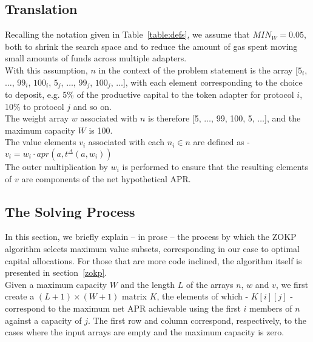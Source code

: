 \documentclass{article}
\begin{document}
\subsection{Translation}

\noindent
Recalling the notation given in Table~\ref{table:defs}, we assume that $MIN_W = 0.05$, both to shrink the search space and to reduce the amount of gas spent moving small amounts of funds across multiple adapters.\\

\noindent
With this assumption, $n$ in the context of the problem statement is the array [$5_i$, $\dots$, $99_i$, $100_i$, $5_j$, $\dots$, $99_j$, $100_j$, $\dots$], with each element corresponding to the choice to deposit, e.g. 5\% of the productive capital to the token adapter for protocol $i$, 10\% to protocol $j$ and so on.\\

\noindent
The weight array $w$ associated with $n$ is therefore [5, $\dots$, 99, 100, 5, $\dots$], and the maximum capacity $W$ is 100.\\

\noindent
The value elements $v_i$ associated with each $n_i \in n$ are defined as - \\

$v_i = w_i \cdot apr(a, t^{\Delta}(a, w_i))$\\

\noindent
The outer multiplication by $w_i$ is performed to ensure that the resulting elements of $v$ are components of the net hypothetical APR.

\subsection{The Solving Process}

In this section, we briefly explain -- in prose -- the process by which the ZOKP algorithm selects maximum value subsets, corresponding in our case to optimal capital allocations. For those that are more code inclined, the algorithm itself is presented in section~\ref{zokp}.\\

\noindent
Given a maximum capacity $W$ and the length $L$ of the arrays $n$, $w$ and $v$, we first create a $(L+1) \times (W+1)$ matrix $K$, the elements of which - $K[i][j]$ - correspond to the maximum net APR achievable using the first $i$ members of $n$ against a capacity of $j$. The first row and column correspond, respectively, to the cases where the input arrays are empty and the maximum capacity is zero.\\
\end{document}
